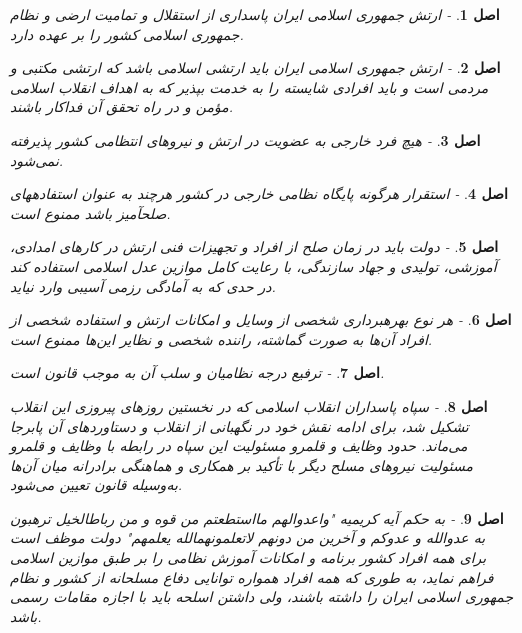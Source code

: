 \documentclass[12pt]{article}
\newtheorem{asl}{اصل}
\begin{document}
\begin{asl}- 
ارتش جمهوری اسلامی ایران پاسداری از استقلال و تمامیت ارضی و نظام جمهوری اسلامی کشور را بر عهده دارد. 
\end{asl}

\begin{asl}- 
ارتش جمهوری اسلامی ایران باید ارتشی اسلامی باشد که ارتشی مکتبی و مردمی است و باید افرادی شایسته را به خدمت بپذیر که به اهداف انقلاب اسلامی مؤمن و در راه تحقق آن فداکار باشند. 
\end{asl}

\begin{asl}- 
هیچ فرد خارجی به عضویت در ارتش و نیروهای انتظامی کشور پذیرفته نمی‌شود. 
\end{asl}

\begin{asl}- 
استقرار هرگونه پایگاه نظامی خارجی در کشور هرچند به عنوان استفاده‏های صلح‏آمیز باشد ممنوع است.
\end{asl}

\begin{asl}- 
دولت باید در زمان صلح از افراد و تجهیزات فنی ارتش در کارهای امدادی، آموزشی، تولیدی و جهاد سازندگی، با رعایت کامل موازین عدل اسلامی استفاده کند در حدی که به آمادگی رزمی آسیبی وارد نیاید. 
\end{asl}

\begin{asl}- 
هر نوع بهره‏برداری شخصی از وسایل و امکانات ارتش و استفاده شخصی از افراد آن‌ها به صورت گماشته، راننده شخصی و نظایر این‌ها ممنوع است. 
\end{asl}

\begin{asl}- 
ترفیع درجه نظامیان و سلب آن به موجب قانون است. 
\end{asl}

\begin{asl}- 
سپاه پاسداران انقلاب اسلامی که در نخستین روزهای پیروزی این انقلاب تشکیل شد، برای ادامه نقش خود در نگهبانی از انقلاب و دستاوردهای آن پابرجا می‌ماند. حدود وظایف و قلمرو مسئولیت این سپاه در رابطه با وظایف و قلمرو مسئولیت نیروهای مسلح دیگر با تأکید بر همکاری و هماهنگی برادرانه میان آن‌ها به‌وسیله قانون تعیین می‌شود.  
\end{asl}

\begin{asl}- 
به حکم آیه کریمیه "واعدوالهم مااستطعتم من قوه و من رباط‏الخیل ترهبون به عدوالله و عدوکم و آخرین من دونهم لاتعلمونهم‏الله یعلمهم" دولت موظف است برای همه افراد کشور برنامه و امکانات آموزش نظامی را بر طبق موازین اسلامی فراهم نماید، به طوری که همه افراد همواره توانایی دفاع مسلحانه از کشور و نظام جمهوری اسلامی ایران را داشته باشند، ولی داشتن اسلحه باید با اجازه مقامات رسمی باشد. 
\end{asl}
\end{document}

